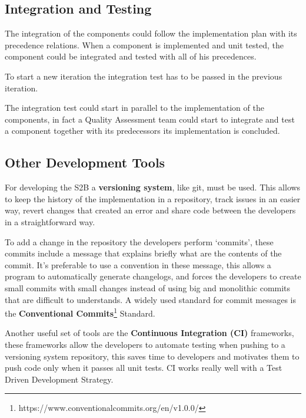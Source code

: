 \subsection{Integration and Testing}
The integration of the components could follow the implementation plan with its precedence relations. When a component is implemented and unit tested, the component could be integrated and tested with all of his precedences.

To start a new iteration the integration test has to be passed in the previous iteration. 

The integration test could start in parallel to the implementation of the components, in fact a Quality Assessment team could start to integrate and test a component together with its predecessors its implementation is concluded. 


\subsection{Other Development Tools}
For developing the S2B a \textbf{versioning system}, like git, must be used. This allows to keep the history of the implementation in a repository, track issues in an easier way, revert changes that created an error and share code between the developers in a straightforward way.

To add a change in the repository the developers perform `commits', these commits include a message that explains briefly what are the contents of the commit. It's preferable to use a convention in these message, this allows a program to automatically generate changelogs, and forces the developers to create small commits with small changes instead of using big and monolithic commits that are difficult to understands. A widely used standard for commit messages is the \textbf{Conventional Commits}\footnote{https://www.conventionalcommits.org/en/v1.0.0/} Standard.  

Another useful set of tools are the \textbf{Continuous Integration (CI)} frameworks, these frameworks allow the developers to automate testing when pushing to a versioning system repository, this saves time to developers and motivates them to push code only when it passes all unit tests. CI works really well with a Test Driven Development Strategy.